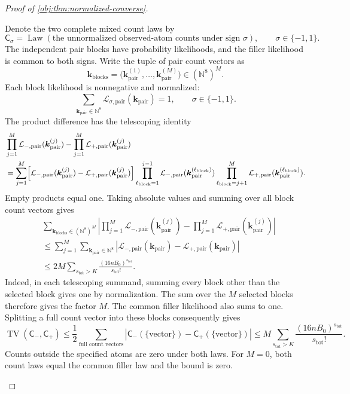 \documentclass[11pt]{article}
\begin{document}
\begin{proof}[Proof of \cref{obj:thm:normalized-converse}]
\begin{enumerate}
Denote the two complete mixed count laws by
\[
\mathsf C_\sigma
=\operatorname{Law}(\text{the unnormalized observed-atom counts
under sign }\sigma),
\qquad \sigma\in\{-1,1\}.
\]
The independent pair blocks have probability likelihoods, and the filler likelihood is common to both signs. Write the tuple of pair count vectors as
\[
\boldsymbol{k}_{\mathrm{blocks}}
=\bigl(\boldsymbol{k}_{\mathrm{pair}}^{(1)},\ldots,
       \boldsymbol{k}_{\mathrm{pair}}^{(M)}\bigr)
\in(\mathbb N^8)^M.
\]
Each block likelihood is nonnegative and normalized:
\[
\sum_{\boldsymbol{k}_{\mathrm{pair}}\in\mathbb N^8}
\mathcal L_{\sigma,\mathrm{pair}}(\boldsymbol{k}_{\mathrm{pair}})=1,
\qquad \sigma\in\{-1,1\}.
\]
The product difference has the telescoping identity
\[
\begin{aligned}
&\prod_{j=1}^{M}
\mathcal L_{-,\mathrm{pair}}(\boldsymbol{k}_{\mathrm{pair}}^{(j)})
-\prod_{j=1}^{M}
\mathcal L_{+,\mathrm{pair}}(\boldsymbol{k}_{\mathrm{pair}}^{(j)})\\
&=\sum_{j=1}^{M}
\Bigl[
\mathcal L_{-,\mathrm{pair}}(\boldsymbol{k}_{\mathrm{pair}}^{(j)})
-\mathcal L_{+,\mathrm{pair}}(\boldsymbol{k}_{\mathrm{pair}}^{(j)})
\Bigr]
\prod_{\ell_{\mathrm{block}}=1}^{j-1}
\mathcal L_{-,\mathrm{pair}}
 (\boldsymbol{k}_{\mathrm{pair}}^{(\ell_{\mathrm{block}})})
\prod_{\ell_{\mathrm{block}}=j+1}^{M}
\mathcal L_{+,\mathrm{pair}}
 (\boldsymbol{k}_{\mathrm{pair}}^{(\ell_{\mathrm{block}})}).
\end{aligned}
\]
Empty products equal one. Taking absolute values and summing over all block count vectors gives
\[
\begin{aligned}
&\sum_{\boldsymbol{k}_{\mathrm{blocks}}\in(\mathbb N^8)^M}
\left|
\prod_{j=1}^{M}
\mathcal L_{-,\mathrm{pair}}(\boldsymbol{k}_{\mathrm{pair}}^{(j)})
-\prod_{j=1}^{M}
\mathcal L_{+,\mathrm{pair}}(\boldsymbol{k}_{\mathrm{pair}}^{(j)})
\right|\\
&\le\sum_{j=1}^{M}
\sum_{\boldsymbol{k}_{\mathrm{pair}}\in\mathbb N^8}
\left|
\mathcal L_{-,\mathrm{pair}}(\boldsymbol{k}_{\mathrm{pair}})
-\mathcal L_{+,\mathrm{pair}}(\boldsymbol{k}_{\mathrm{pair}})
\right|\\
&\le 2M\sum_{s_{\mathrm{tot}}>K}
\frac{(16nB_0)^{s_{\mathrm{tot}}}}{s_{\mathrm{tot}}!}.
\end{aligned}
\]
Indeed, in each telescoping summand, summing every block other than the selected block gives one by normalization. The sum over the \(M\) selected blocks therefore gives the factor \(M\). The common filler likelihood also sums to one. Splitting a full count vector into these blocks consequently gives
\[
\operatorname{TV}(\mathsf C_-,\mathsf C_+)
\le
\frac12\sum_{\text{full count vectors}}
|\mathsf C_-(\{\text{vector}\})-\mathsf C_+(\{\text{vector}\})|
\le
M\sum_{s_{\mathrm{tot}}>K}
\frac{(16nB_0)^{s_{\mathrm{tot}}}}{s_{\mathrm{tot}}!}.
\]
Counts outside the specified atoms are zero under both laws. For \(M=0\), both count laws equal the common filler law and the bound is zero.


\end{enumerate}
\end{proof}
\end{document}
